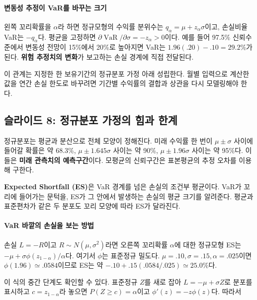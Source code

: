 \documentclass[11pt,a4paper]{article}
\begin{document}
\paragraph{변동성 추정이 VaR를 바꾸는 크기}

왼쪽 꼬리확률을 $\alpha$라 하면 정규모형의 수익률 분위수는 $q_\alpha=\mu+z_\alpha\sigma$이고, 손실비율 VaR는 $-q_\alpha$다. 평균을 고정하면 $\partial\operatorname{VaR}/\partial\sigma=-z_\alpha>0$이다. 예를 들어 97.5\% 신뢰수준에서 변동성 전망이 15\%에서 20\%로 높아지면 VaR는 $1.96(.20)-.10=29.2\%$가 된다. \textbf{위험 추정치의 변화}가 보고하는 손실 경계에 직접 전달된다.
\par

이 관계는 지정한 한 보유기간의 정규분포 가정 아래 성립한다. 월별 입력으로 계산한 값을 연간 손실 한도로 바꾸려면 기간별 수익률의 결합과 상관을 다시 모델링해야 한다.
\par

\subsection{슬라이드 8: 정규분포 가정의 힘과 한계}

정규분포는 평균과 분산으로 전체 모양이 정해진다. 미래 수익률 한 번이 $\mu\pm\sigma$ 사이에 들어갈 확률은 약 68.3\%, $\mu\pm1.645\sigma$ 사이는 약 90\%, $\mu\pm1.96\sigma$ 사이는 약 95\%다. 이들은 \textbf{미래 관측치의 예측구간}이다. 모평균의 신뢰구간은 표본평균의 추정 오차를 이용해 구한다.
\par

\textbf{Expected Shortfall (ES)}은 VaR 경계를 넘은 손실의 조건부 평균이다. VaR가 꼬리에 들어가는 문턱을, ES가 그 안에서 발생하는 손실의 평균 크기를 알려준다. 평균과 표준편차가 같은 두 분포도 꼬리 모양에 따라 ES가 달라진다.
\par

\paragraph{VaR 바깥의 손실을 보는 방법}

손실 $L=-R$이고 $R\sim N(\mu,\sigma^2)$라면 오른쪽 꼬리확률 $\alpha$에 대한 정규모형 ES는 $-\mu+\sigma\phi(z_{1-\alpha})/\alpha$다. 여기서 $\phi$는 표준정규 밀도다. $\mu=.10,\sigma=.15,\alpha=.025$이면 $\phi(1.96)\simeq.0584$이므로 ES는 약 $-.10+.15(.0584/.025)\simeq25.0\%$다.
\par

이 식의 중간 단계도 확인할 수 있다. 표준정규 $Z$를 새로 잡아 $L=-\mu+\sigma Z$로 분포를 표시하고 $c=z_{1-\alpha}$라 놓으면 $P(Z\ge c)=\alpha$이고 $\phi'(z)=-z\phi(z)$다. 따라서
\par
\end{document}

